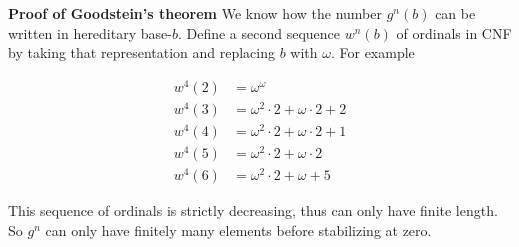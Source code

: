 \textbf{Proof of Goodstein's theorem} We know how the number $g^n(b)$ can be written in hereditary base-$b$. Define a second sequence $w^n(b)$ of ordinals in CNF by taking that representation and replacing $b$ with $\omega$. For example

\begin{align*}
	w^4(2) &= \omega^\omega \\
	w^4(3) &= \omega^2 \cdot 2 + \omega \cdot 2 + 2 \\
	w^4(4) &= \omega^2 \cdot 2 + \omega \cdot 2 + 1 \\
	w^4(5) &= \omega^2 \cdot 2 + \omega \cdot 2 \\
	w^4(6) &= \omega^2 \cdot 2 + \omega + 5
\end{align*}

This sequence of ordinals is strictly decreasing, thus can only have finite length. So $g^n$ can only have finitely many elements before stabilizing at zero.
